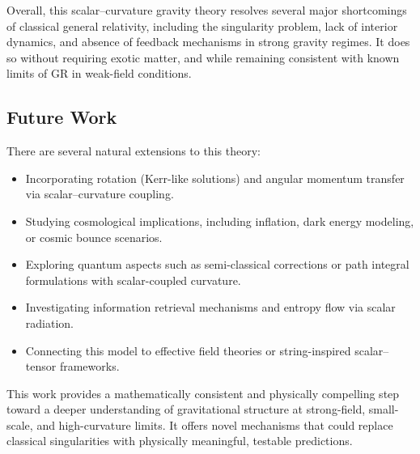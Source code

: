 \documentclass[12pt]{article}
\begin{document}
Overall, this scalar--curvature gravity theory resolves several major shortcomings of classical general relativity, including the singularity problem, lack of interior dynamics, and absence of feedback mechanisms in strong gravity regimes. It does so without requiring exotic matter, and while remaining consistent with known limits of GR in weak-field conditions.

\subsection*{Future Work}

There are several natural extensions to this theory:

\begin{itemize}
    \item Incorporating rotation (Kerr-like solutions) and angular momentum transfer via scalar–curvature coupling.
    \item Studying cosmological implications, including inflation, dark energy modeling, or cosmic bounce scenarios.
    \item Exploring quantum aspects such as semi-classical corrections or path integral formulations with scalar-coupled curvature.
    \item Investigating information retrieval mechanisms and entropy flow via scalar radiation.
    \item Connecting this model to effective field theories or string-inspired scalar–tensor frameworks.
\end{itemize}

This work provides a mathematically consistent and physically compelling step toward a deeper understanding of gravitational structure at strong-field, small-scale, and high-curvature limits. It offers novel mechanisms that could replace classical singularities with physically meaningful, testable predictions.
\end{document}
